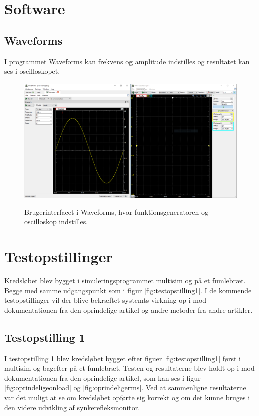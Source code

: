 \section{Software}
\subsection{Waveforms}

I programmet Waveforms kan frekvens og amplitude indstilles og resultatet kan ses i oscilloskopet.

\begin{figure}[H]
\centering
{\includegraphics[width=14cm]
{Figure/waveforms}}
\caption{Brugerinterfacet i Waveforms, hvor funktionsgeneratoren og oscilloskop indstilles. }
\label{fig:waveforms}
\end{figure}











\section{Testopstillinger}

Kredsløbet blev bygget i simuleringsprogrammet multisim og på et fumlebræt. Begge med samme udgangspunkt som i figur \ref{fig:testopstilling1}. I de kommende testopstillinger vil der blive bekræftet systemts virkning op i mod dokumentationen fra den oprindelige artikel og andre metoder fra andre artikler.
\subsection{Testopstilling 1}




I testopstilling 1 blev kredsløbet bygget efter figuer \ref{fig:testopstilling1} først i multisim og bagefter på et fumlebræt. Testen og resultaterne blev holdt op i mod dokumentationen fra den oprindelige artikel, som kan ses i figur \ref{fig:oprindeligeonload} og \ref{fig:oprindeligerms}. Ved at sammenligne resultaterne var det muligt at se om kredsløbet opførte sig korrekt og om det kunne bruges i den videre udvikling af synkerefleksmonitor. 

